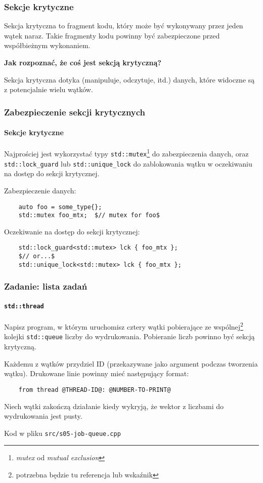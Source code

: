 \documentclass[aspectratio=169]{beamer}
\begin{document}
\begin{frame}
    \frametitle{Sekcje krytyczne}

    Sekcja krytyczna to fragment kodu, który może być wykonywany przez jeden
    wątek naraz. Takie fragmenty kodu powinny być zabezpieczone przed
    współbieżnym wykonaniem.

    \vspace{1em}

    \textbf{Jak rozpoznać, że coś jest sekcją krytyczną?}

    Sekcja krytyczna dotyka (manipuluje, odczytuje, itd.) danych, które widoczne
    są z potencjalnie wielu wątków.
\end{frame}

\begin{frame}[fragile]
    \frametitle{Zabezpieczenie sekcji krytycznych}
    \framesubtitle{Sekcje krytyczne}

    Najprościej jest wykorzystać typy \texttt{std::mutex}\footnote{\emph{mutex}
    od \emph{mutual exclusion}} do zabezpieczenia danych, oraz
    \texttt{std::lock\_guard} lub \texttt{std::unique\_lock} do zablokowania
    wątku w oczekiwaniu na dostęp do sekcji krytycznej.

    \vspace{1em}

    Zabezpieczenie danych:
    {\scriptsize
    \begin{lstlisting}
    auto foo = some_type{};
    std::mutex foo_mtx;  $// mutex for foo$
    \end{lstlisting}}

    Oczekiwanie na dostęp do sekcji krytycznej:
    {\scriptsize
    \begin{lstlisting}
    std::lock_guard<std::mutex> lck { foo_mtx };
    $// or...$
    std::unique_lock<std::mutex> lck { foo_mtx };
    \end{lstlisting}}
\end{frame}

\begin{frame}[fragile]
    \frametitle{Zadanie: lista zadań}
    \framesubtitle{\texttt{std::thread}}
    \label{lecture_exercise_2}

    Napisz program, w którym uruchomisz cztery wątki pobierające ze
    wspólnej\footnote{potrzebna będzie tu referencja lub wskaźnik} kolejki
    \texttt{std::queue} liczby do wydrukowania. Pobieranie liczb powinno być
    sekcją krytyczną.

    Każdemu z wątków przydziel ID (przekazywane jako argument podczas tworzenia
    wątku). Drukowane linie powinny mieć następujący format:

    {\scriptsize
    \begin{lstlisting}
    from thread @THREAD-ID@: @NUMBER-TO-PRINT@
    \end{lstlisting}}

    Niech wątki zakończą działanie kiedy wykryją, że wektor z liczbami do
    wydrukowania jest pusty.

    \vspace{1em}

    Kod w pliku \texttt{src/s05-job-queue.cpp}
\end{frame}
\end{document}
